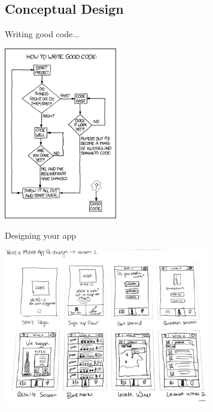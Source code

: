 \documentclass[xcolor=svgnames,11pt]{beamer}
\begin{document}
\subsection{Conceptual Design}
\begin{frame}{Writing good code...}
\begin{center}
\includegraphics[height=7.5cm]{xkcd.png}
\end{center}
\end{frame}

\begin{frame}{Designing your app}
\begin{center}
\includegraphics[width=9cm]{drawing.jpg}
\end{center}
\end{frame}
\end{document}
